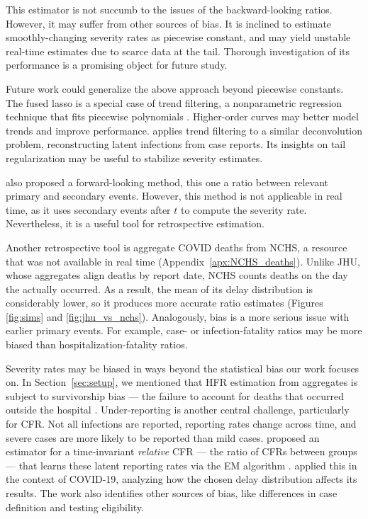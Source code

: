\documentclass{article}
\begin{document}
This estimator is not succumb to the issues of the backward-looking ratios. However, it may suffer from other sources of bias. It is inclined to estimate smoothly-changing severity rates as piecewise constant, and may yield unstable real-time estimates due to scarce data at the tail. 
Thorough investigation of its performance is a promising object for future study.

Future work could generalize the above approach beyond piecewise constants. The fused lasso is a special case of trend filtering, a nonparametric regression technique that fits piecewise polynomials \citet{Tibshirani2014}. Higher-order curves may better model trends and improve performance. \citep{Jahja2022} applies trend filtering to a similar deconvolution problem, reconstructing latent infections from case reports. Its insights on tail regularization may be useful to stabilize severity estimates. 

\citet{UKpaper} also proposed a forward-looking method, this one a ratio between relevant primary and secondary events. However, this method is not applicable in real time, as it uses secondary events after $t$ to compute the severity rate. Nevertheless, it is a useful tool for retrospective estimation. 

Another retrospective tool is aggregate COVID deaths from NCHS, a resource that
was not available in real time (Appendix~\ref{apx:NCHS_deaths}). Unlike JHU,
whose aggregates align deaths by report date, NCHS counts deaths on the day the
actually occurred. As a result, the mean of its delay distribution is
considerably lower, so it produces more accurate ratio estimates (Figures
\ref{fig:sims} and \ref{fig:jhu_vs_nchs}). Analogously, bias is a more serious
issue with earlier primary events. For example, case- or infection-fatality
ratios may be more biased than hospitalization-fatality ratios. 

Severity rates may be biased in ways beyond the statistical bias our work
focuses on. 
In Section~\ref{sec:setup}, we mentioned that 
HFR estimation from aggregates is subject to survivorship bias --- 
the failure to account for deaths that occurred outside the hospital \citep{lipsitch2015potential}.
Under-reporting is another central challenge, particularly for CFR.
Not all infections are reported, reporting rates change across time, and severe
cases are more likely to be reported than mild cases.
\citet{reich2012estimating} proposed an estimator for a time-invariant
\emph{relative} CFR --- the ratio of CFRs between groups --- that learns these
latent reporting rates via the EM algorithm \citep{EM}. \citet{anastasios}
applied this in the context of COVID-19, analyzing how the chosen delay
distribution affects its results. The work also identifies other sources of bias, like
differences in case definition and testing eligibility.
\end{document}
